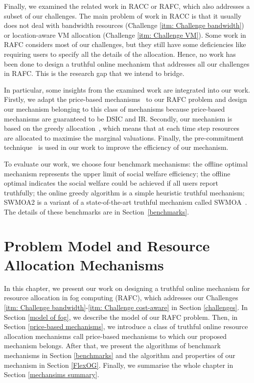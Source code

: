 \documentclass[11pt]{phdthesis}
\begin{document}
Finally, we examined the related work in RACC or RAFC, which also addresses a subset of our challenges. The main problem of work in RACC is that it usually does not deal with bandwidth resources (Challenge \ref{itm: Challenge bandwidth}) or location-aware VM allocation (Challenge \ref{itm: Challenge VM}). Some work in RAFC considers most of our challenges, but they still have some deficiencies like requiring users to specify all the details of the allocation. Hence, no work has been done to design a truthful online mechanism that addresses all our challenges in RAFC. This is the research gap that we intend to bridge.

In particular, some insights from the examined work are integrated into our work. Firstly, we adapt the price-based mechanisms~\citep{hayakawa2018price} to our RAFC problem and design our mechanism belonging to this class of mechanisms because price-based mechanisms are guaranteed to be DSIC and IR. Secondly, our mechanism is based on the greedy allocation~\citep{gerding2011online}, which means that at each time step resources are allocated to maximise the marginal valuations. Finally, the pre-commitment technique~\citep{stein2012model} is used in our work to improve the efficiency of our mechanism. 

To evaluate our work, we choose four benchmark mechanisms: the offline optimal mechanism represents the upper limit of social welfare efficiency; the offline optimal indicates the social welfare could be achieved if all users report truthfully; the online greedy algorithm is a simple heuristic truthful mechanism; SWMOA2 is a variant of a state-of-the-art truthful mechanism called SWMOA~\citep{shi2017online}. The details of these benchmarks are in Section~\ref{benchmarks}.

\chapter{Problem Model and Resource Allocation Mechanisms} \label{our mechanism}

In this chapter, we present our work on designing a truthful online mechanism for resource allocation in fog computing (RAFC), which addresses our Challenges \ref{itm: Challenge bandwidth}-\ref{itm: Challenge cost-aware} in Section \ref{challenges}. In Section \ref{model of fog}, we describe the model of our RAFC problem. Then, in Section \ref{price-based mechanisms}, we introduce a class of truthful online resource allocation mechanisms call price-based mechanisms to which our proposed mechanism belongs. After that, we present the algorithms of benchmark mechanisms in Section \ref{benchmarks} and the algorithm and properties of our mechanism in Section \ref{FlexOG}. Finally, we summarise the whole chapter in Section \ref{mechansims summary}. 
\end{document}
